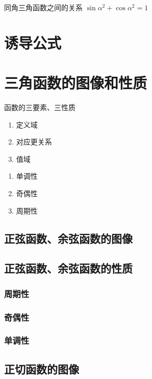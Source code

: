\begin{definition}{同角三角函数之间的关系}{}
${\sin{\alpha}}^2 + {\cos{\alpha}}^2 = 1$
\end{definition}

\section{诱导公式}



\section{三角函数的图像和性质}

\begin{remark}
函数的三要素、三性质
\begin{enumerate}
\item 定义域
\item 对应更关系
\item 值域
\end{enumerate}
\begin{enumerate}
\item 单调性
\item 奇偶性
\item 周期性
\end{enumerate}
\end{remark}

\subsection{正弦函数、余弦函数的图像}
\subsection{正弦函数、余弦函数的性质}
\subsubsection{周期性}
\subsubsection{奇偶性}
\subsubsection{单调性}

\subsection{正切函数的图像}
